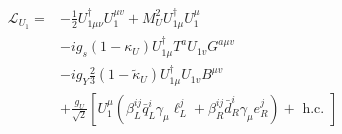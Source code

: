 $$
\begin{aligned}
\mathcal{L}_{U_{1}}=&-\frac{1}{2} U_{1 \mu \nu}^{\dagger} U_{1}^{\mu v}+M_{U}^{2} U_{1 \mu}^{\dagger} U_{1}^{\mu} \\
&-i g_{s}\left(1-\kappa_{U}\right) U_{1 \mu}^{\dagger} T^{a} U_{1 v} G^{a \mu v} \\
&-i g_{Y} \frac{2}{3}\left(1-\tilde{\kappa}_{U}\right) U_{1 \mu}^{\dagger} U_{1 v} B^{\mu v} \\
&+\frac{g_{U}}{\sqrt{2}}\left[U_{1}^{\mu}\left(\beta_{L}^{i j} \bar{q}_{L}^{i} \gamma_{\mu} \ell_{L}^{j}+\beta_{R}^{i j} \bar{d}_{R}^{i} \gamma_{\mu} e_{R}^{j}\right)+\text { h.c. }\right]
\end{aligned}
$$





